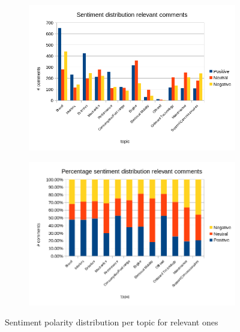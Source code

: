 \begin{figure}[ht]
	\centering
	\begin{subfigure}{1\textwidth} %
		\includegraphics[width=1\textwidth]{figures/charts/sentiment-distribution.png}
		\label{fig:sentiment-distribution}
	\end{subfigure}
	\vspace{-1cm} %
	\begin{subfigure}{1\textwidth} %
		\includegraphics[width=1\textwidth]{figures/charts/sentiment-distribution-perc.png}
		\label{fig:sentiment-distribution-perc}
	\end{subfigure}
	\caption{Sentiment polarity distribution per topic for relevant ones} %
	\label{fig:annotations-relevant}
\end{figure}



















